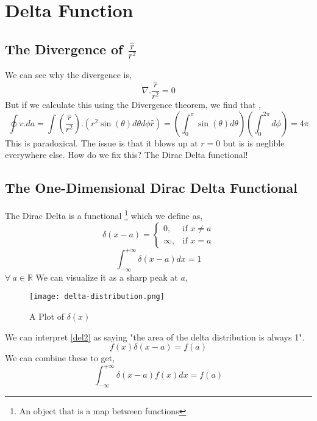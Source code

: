 \section{Delta Function}
\subsection{The Divergence of $\frac{\hat{r}}{r^{2}}$}
We can see why the divergence is,
\begin{equation}
\nabla . \frac{\hat{r}}{r^{2}} = 0
\end{equation}
But if we calculate this using the Divergence theorem, we find that ,
\begin{equation}
	\oint v .da = \int \left( \frac{\hat{r}}{r^{2}} \right) . \left( r^{2} \sin(\theta) d \theta d \phi \hat{r} \right) = \left( \int_{0}^{\pi} \sin(\theta) d \theta \right) \left( \int_{0}^{2\pi} d \phi \right) = 4 \pi
\end{equation}
This is paradoxical. The issue is that it blows up at $r=0$ but is is neglible everywhere else. How do we fix this? The Dirac Delta functional!
\subsection{The One-Dimensional Dirac Delta Functional}
The Dirac Delta is a functional \footnote{An object that is a map between functions} which we define as,
\begin{equation}
\delta(x-a)= 
\begin{cases}
0, & \text{if } x \neq a\\
\infty,              & \text{if } x = a
\end{cases}
\label{del1}
\end{equation}
\begin{equation}
\int_{- \infty}^{+ \infty} \delta(x-a) dx = 1
\label{del2}
\end{equation}
$\forall \  a \in \mathbb{R}$
We can visualize it as a sharp peak at $a$,
\begin{figure}
	\centering
	\texttt{[image: delta-distribution.png]}
	\caption{A Plot of $\delta(x)$}
\end{figure}
We can interpret \ref{del2} as saying "the area of the delta distribution is always 1".
\begin{equation}
f(x)\delta(x - a ) = f(a)
\end{equation}
We can combine these to get,
\begin{equation}
\int_{- \infty}^{+ \infty} \delta(x-a) f(x) dx = f(a)
\end{equation}
